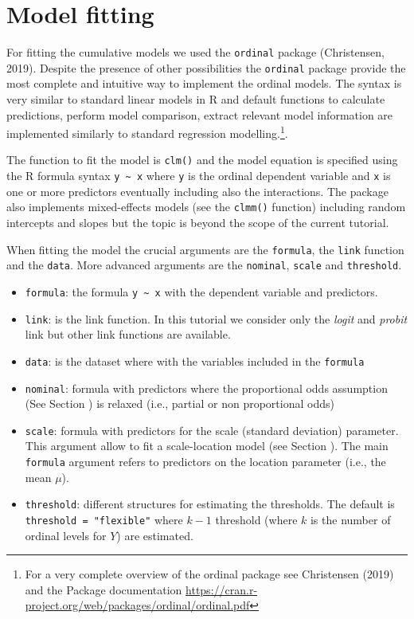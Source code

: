 \documentclass[
  man,floatsintext]{apa6}
\providecommand{\tightlist}{%
  \setlength{\itemsep}{0pt}\setlength{\parskip}{0pt}}
\begin{document}
\normalsize

\section{Model fitting}\label{model-fitting}

For fitting the cumulative models we used the \texttt{ordinal} package (Christensen, 2019). Despite the presence of other possibilities the \texttt{ordinal} package provide the most complete and intuitive way to implement the ordinal models. The syntax is very similar to standard linear models in R and default functions to calculate predictions, perform model comparison, extract relevant model information are implemented similarly to standard regression modelling.\footnote{For a very complete overview of the ordinal package see Christensen (2019) and the Package documentation \url{https://cran.r-project.org/web/packages/ordinal/ordinal.pdf}}.

The function to fit the model is \texttt{clm()} and the model equation is specified using the R formula syntax \texttt{y\ \textasciitilde{}\ x} where \texttt{y} is the ordinal dependent variable and \texttt{x} is one or more predictors eventually including also the interactions. The package also implements mixed-effects models (see the \texttt{clmm()} function) including random intercepts and slopes but the topic is beyond the scope of the current tutorial.

When fitting the model the crucial arguments are the \texttt{formula}, the \texttt{link} function and the \texttt{data}. More advanced arguments are the \texttt{nominal}, \texttt{scale} and \texttt{threshold}.

\begin{itemize}
\tightlist
\item
  \texttt{formula}: the formula \texttt{y\ \textasciitilde{}\ x} with the dependent variable and predictors.
\item
  \texttt{link}: is the link function. In this tutorial we consider only the \emph{logit} and \emph{probit} link but other link functions are available.
\item
  \texttt{data}: is the dataset where with the variables included in the \texttt{formula}
\item
  \texttt{nominal}: formula with predictors where the proportional odds assumption (See Section ) is relaxed (i.e., partial or non proportional odds)
\item
  \texttt{scale}: formula with predictors for the scale (standard deviation) parameter. This argument allow to fit a scale-location model (see Section ). The main \texttt{formula} argument refers to predictors on the location parameter (i.e., the mean \(\mu\)).
\item
  \texttt{threshold}: different structures for estimating the thresholds. The default is \texttt{threshold\ =\ "flexible"} where \(k - 1\) threshold (where \(k\) is the number of ordinal levels for \(Y\)) are estimated.
\end{itemize}
\end{document}
